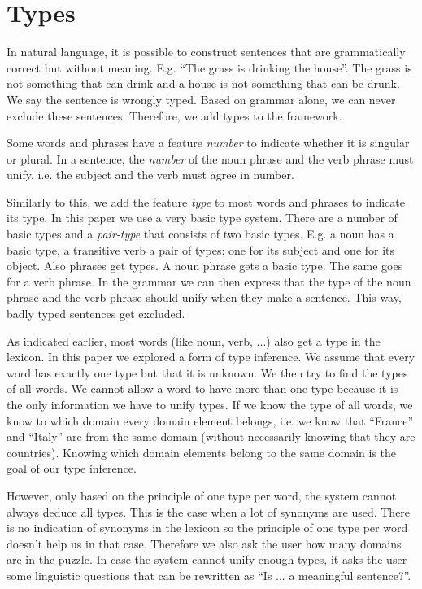 \section{Types}
\label{sec:types}
In natural language, it is possible to construct sentences that are grammatically correct but without meaning. E.g. ``The grass is drinking the house''. The grass is not something that can drink and a house is not something that can be drunk. We say the sentence is wrongly typed. Based on grammar alone, we can never exclude these sentences. Therefore, we add types to the framework.

Some words and phrases have a feature \textit{number} to indicate whether it is singular or plural. In a sentence, the \textit{number} of the noun phrase and the verb phrase must unify, i.e. the subject and the verb must agree in number.

Similarly to this, we add the feature \textit{type} to most words and phrases to indicate its type. In this paper we use a very basic type system. There are a number of basic types and a \textit{pair-type} that consists of two basic types. E.g. a noun has a basic type, a transitive verb a pair of types: one for its subject and one for its object. Also phrases get types. A noun phrase gets a basic type. The same goes for a verb phrase. In the grammar we can then express that the type of the noun phrase and the verb phrase should unify when they make a sentence. This way, badly typed sentences get excluded.

As indicated earlier, most words (like noun, verb, ...) also get a type in the lexicon. In this paper we explored a form of type inference. We assume that every word has exactly one type but that it is unknown. We then try to find the types of all words. We cannot allow a word to have more than one type because it is the only information we have to unify types. If we know the type of all words, we know to which domain every domain element belongs, i.e. we know that ``France'' and ``Italy'' are from the same domain (without necessarily knowing that they are countries). Knowing which domain elements belong to the same domain is the goal of our type inference.

However, only based on the principle of one type per word, the system cannot always deduce all types. This is the case when a lot of synonyms are used. There is no indication of synonyms in the lexicon so the principle of one type per word doesn't help us in that case. Therefore we also ask the user how many domains are in the puzzle. In case the system cannot unify enough types, it asks the user some linguistic questions that can be rewritten as ``Is ... a meaningful sentence?''.

